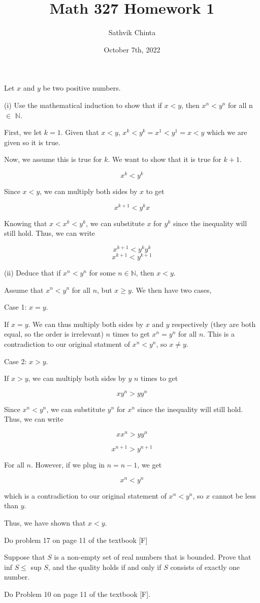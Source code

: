 \documentclass[addpoints]{exam}
\title{Math 327 Homework 1}
\author{Sathvik Chinta}
\date{October 7th, 2022}
\begin{document}
\maketitle

\begin{questions}
\question Let $x$ and $y$ be two positive numbers. 

(i) Use the mathematical induction to show that if $x < y$, then $x^n < y^n$ for all
n $\in$ $\mathbb{N}$. 

First, we let $k = 1$. Given that $x < y$, $x^{k} < y^{k} = x^{1} < y^{1} = x < y$ which we are given so it is true. 

Now, we assume this is true for $k$. We want to show that it is true for $k+1$.

\[x^{k} < y^{k}\]

Since $x < y$, we can multiply both sides by $x$ to get

\[x^{k+1} < y^{k}x\]

Knowing that $x < x^{k} < y^{k}$, we can substitute $x$ for $y^{k}$ since the inequality will still hold. Thus, we can write

\[x^{k+1} < y^{k}y^{k}\]
\[x^{k+1} < y^{k+1}\]

(ii) Deduce that if $x^n < y^n$ for some $n \in \mathbb{N}$, then $x < y$.

Assume that $x^{n} < y^{n}$ for all $n$, but $x \geq y$. We then have two cases, 

Case 1: $x = y$.

If $x = y$. We can thus multiply both sides by $x$ and $y$ respectively (they are both equal, so 
the order is irrelevant) $n$ times to get $x^{n} = y^{n}$ for all $n$. This is a contradiction to our original statment of 
$x^{n} < y^{n}$, so $x \neq y$.

Case 2: $x > y$.

If $x > y$, we can multiply both sides by $y$ $n$ times to get 

\[xy^{n} > yy^{n}\]

Since $x^{n} < y^{n}$, we can substitute $y^{n}$ for $x^{n}$ since the inequality will still hold. Thus, we can write

\[xx^{n} > yy^{n}\]

\[x^{n+1} > y^{n+1}\]

For all $n$. However, if we plug in $n = n - 1$, we get 

\[x^{n} < y^{n}\]

which is a contradiction to our original statement of $x^{n} < y^{n}$, so $x$ cannot be less than $y$. 

Thus, we have shown that $x < y$.

\question Do problem 17 on page 11 of the textbook [F]

\question Suppose that $S$ is a non-empty set of real numbers that is bounded. Prove
that inf $S \leq$ sup $S$, and the quality holds if and only if $S$ consists of exactly
one number.

\question Do Problem 10 on page 11 of the textbook [F].

\end{questions}
\end{document}
